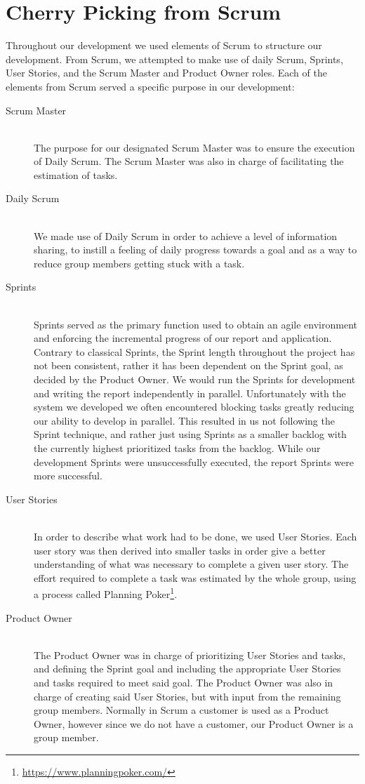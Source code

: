 \section{Cherry Picking from Scrum}
Throughout our development we used elements of Scrum to structure our development.
From Scrum, we attempted to make use of daily Scrum, Sprints, User Stories, and the Scrum Master and Product Owner roles.
Each of the elements from Scrum served a specific purpose in our development:
\begin{description}
    \item [Scrum Master] \hfill \\
        The purpose for our designated Scrum Master was to ensure the execution of Daily Scrum.
        The Scrum Master was also in charge of facilitating the estimation of tasks.
    \item [Daily Scrum] \hfill \\
        We made use of Daily Scrum in order to achieve a level of information sharing, to instill a feeling of daily progress towards a goal and as a way to reduce group members getting stuck with a task.
    \item [Sprints] \hfill \\
        Sprints served as the primary function used to obtain an agile environment and enforcing the incremental progress of our report and application.
        Contrary to classical Sprints, the Sprint length throughout the project has not been consistent, rather it has been dependent on the Sprint goal, as decided by the Product Owner.
        We would run the Sprints for development and writing the report independently in parallel.
        Unfortunately with the system we developed we often encountered blocking tasks greatly reducing our ability to develop in parallel.
        This resulted in us not following the Sprint technique, and rather just using Sprints as a smaller backlog with the currently highest prioritized tasks from the backlog.
        While our development Sprints were unsuccessfully executed, the report Sprints were more successful.
    \item [User Stories] \hfill \\
        In order to describe what work had to be done, we used User Stories.
        Each user story was then derived into smaller tasks in order give a better understanding of what was necessary to complete a given user story.
        The effort required to complete a task was estimated by the whole group, using a process called Planning Poker\footnote{\url{https://www.planningpoker.com/}}.
    \item [Product Owner] \hfill \\
        The Product Owner was in charge of prioritizing User Stories and tasks, and defining the Sprint goal and including the appropriate User Stories and tasks required to meet said goal.
        The Product Owner was also in charge of creating said User Stories, but with input from the remaining group members.
        Normally in Scrum a customer is used as a Product Owner, however since we do not have a customer, our Product Owner is a group member.
\end{description}

